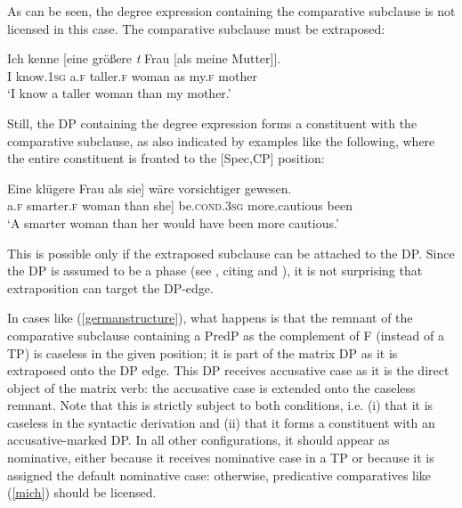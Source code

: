 As can be seen, the degree expression containing the comparative subclause is not licensed in this case. The comparative subclause must be extraposed:

\ea \gll Ich kenne [eine größere \textit{t} Frau [als meine Mutter]].\\
I know.\textsc{1sg} \phantom{[}a.\textsc{f} taller.\textsc{f} {} woman \phantom{[}as my.\textsc{f} mother\\
\glt `I know a taller woman than my mother.'
\z

Still, the DP containing the degree expression forms a constituent with the comparative subclause, as also indicated by examples like the following, where the entire constituent is fronted to the [Spec,CP] position:

\ea \gll {[}Eine klügere Frau als sie] wäre vorsichtiger gewesen.\\
\phantom{[}a.\textsc{f} smarter.\textsc{f} woman than she] be.\textsc{cond.3sg} more.cautious been\\
\glt `A smarter woman than her would have been more cautious.'
\z

This is possible only if the extraposed subclause can be attached to the DP. Since the DP is assumed to be a phase (see \citealt{chomsky2008}, citing \citealt{svenonius2004} and \citealt{hiraiwa2005diss}), it is not surprising that extraposition can target the DP-edge.

In cases like (\ref{germanstructure}), what happens is that the remnant of the comparative subclause containing a PredP as the complement of F (instead of a TP) is caseless in the given position; it is part of the matrix DP as it is extraposed onto the DP edge. This DP receives accusative case as it is the direct object of the matrix verb: the accusative case is extended onto the caseless remnant. Note that this is strictly subject to both conditions, i.e. (i) that it is caseless in the syntactic derivation and (ii) that it forms a constituent with an accusative-marked DP. In all other configurations, it should appear as nominative, either because it receives nominative case in a TP or because it is assigned the default nominative case: otherwise, predicative comparatives like (\ref{mich}) should be licensed.

